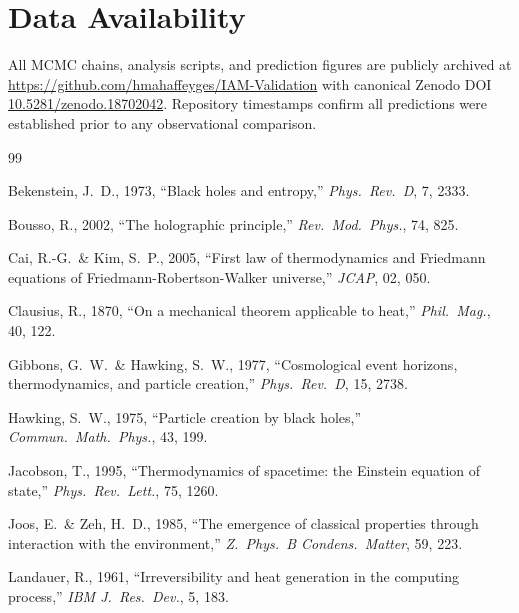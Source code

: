 \documentclass[12pt,a4paper]{article}
\begin{document}
\section*{Data Availability}

All MCMC chains, analysis scripts, and prediction figures are publicly
archived at \url{https://github.com/hmahaffeyges/IAM-Validation} with
canonical Zenodo DOI \href{https://doi.org/10.5281/zenodo.18702042}{10.5281/zenodo.18702042}.
Repository timestamps confirm all predictions were established prior to
any observational comparison.

\begin{thebibliography}{99}

Bekenstein, J.~D., 1973, ``Black holes and entropy,''
\textit{Phys.\ Rev.\ D}, 7, 2333.

Bousso, R., 2002, ``The holographic principle,''
\textit{Rev.\ Mod.\ Phys.}, 74, 825.

Cai, R.-G.\ \& Kim, S.~P., 2005, ``First law of thermodynamics and
Friedmann equations of Friedmann-Robertson-Walker universe,''
\textit{JCAP}, 02, 050.

Clausius, R., 1870, ``On a mechanical theorem applicable to heat,''
\textit{Phil.\ Mag.}, 40, 122.

Gibbons, G.~W.\ \& Hawking, S.~W., 1977, ``Cosmological event horizons,
thermodynamics, and particle creation,''
\textit{Phys.\ Rev.\ D}, 15, 2738.

Hawking, S.~W., 1975, ``Particle creation by black holes,''
\textit{Commun.\ Math.\ Phys.}, 43, 199.

Jacobson, T., 1995, ``Thermodynamics of spacetime: the Einstein equation
of state,'' \textit{Phys.\ Rev.\ Lett.}, 75, 1260.

Joos, E.\ \& Zeh, H.~D., 1985, ``The emergence of classical properties
through interaction with the environment,''
\textit{Z.\ Phys.\ B Condens.\ Matter}, 59, 223.

Landauer, R., 1961, ``Irreversibility and heat generation in the computing
process,'' \textit{IBM J.\ Res.\ Dev.}, 5, 183.


\end{thebibliography}
\end{document}
